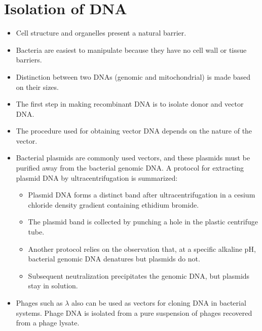 \documentclass[11pt,dvipsnames,ignorenonframetext,aspectratio=169]{beamer}
\providecommand{\tightlist}{%
  \setlength{\itemsep}{0pt}\setlength{\parskip}{0pt}}
\begin{document}
\hypertarget{isolation-of-dna}{%
\section{Isolation of DNA}\label{isolation-of-dna}}

\begin{frame}{}
\protect\hypertarget{section-7}{}
\begin{itemize}
\tightlist
\item
  Cell structure and organelles present a natural barrier.
\item
  Bacteria are easiest to manipulate because they have no cell wall or
  tissue barriers.
\item
  Distinction between two DNAs (genomic and mitochondrial) is made based
  on their sizes.
\item
  The first step in making recombinant DNA is to isolate donor and
  vector DNA.
\end{itemize}
\end{frame}

\begin{frame}{}
\protect\hypertarget{section-8}{}
\begin{itemize}
\tightlist
\item
  The procedure used for obtaining vector DNA depends on the nature of
  the vector.
\item
  Bacterial plasmids are commonly used vectors, and these plasmids must
  be purified away from the bacterial genomic DNA. A protocol for
  extracting plasmid DNA by ultracentrifugation is summarized:

  \begin{itemize}
  \tightlist
  \item
    Plasmid DNA forms a distinct band after ultracentrifugation in a
    cesium chloride density gradient containing ethidium bromide.
  \item
    The plasmid band is collected by punching a hole in the plastic
    centrifuge tube.
  \item
    Another protocol relies on the observation that, at a specific
    alkaline pH, bacterial genomic DNA denatures but plasmids do not.
  \item
    Subsequent neutralization precipitates the genomic DNA, but plasmids
    stay in solution.
  \end{itemize}
\item
  Phages such as \(\lambda\) also can be used as vectors for cloning DNA
  in bacterial systems. Phage DNA is isolated from a pure suspension of
  phages recovered from a phage lysate.
\end{itemize}
\end{frame}
\end{document}
